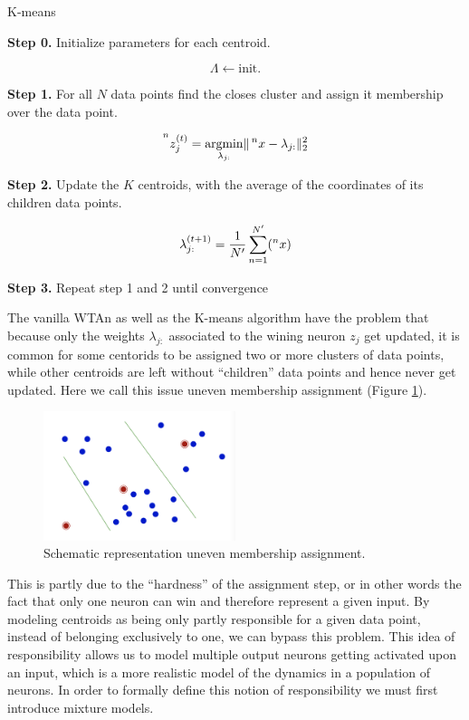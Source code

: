 \documentclass{article}
\begin{document}
\begin{algorithm}
\caption{K-means} \label{kmeans}
\begin{algorithmic}
\State \textbf{Step 0.} Initialize parameters for each centroid.

$$
\Lambda \leftarrow \text{init.}
$$

\State \textbf{Step 1.} For all $N$ data points find the closes cluster and assign it
membership over the data point.

$$
\prescript{n}{}{z^{(t)}_j} = \underset{\lambda_{j:}}{\operatorname{arg min}} \| \prescript{n}{}{x} - \lambda_{j:}\|_2^2
$$

\State \textbf{Step 2.} Update the $K$ centroids, with the average of the coordinates of its
children data points.

$$
\lambda_{j:}^{(t+1)} = \frac{1}{N'} \sum_{n=1}^{N'} (\prescript{n}{}{x})
$$

\State \textbf{Step 3.} Repeat step 1 and 2 until convergence

\end{algorithmic}
\end{algorithm}

The vanilla WTAn as well as the K-means algorithm have the problem
that because only the weights \(\lambda_{j:}\) associated to the wining
neuron \(z_j\) get updated, it is common for some centorids to be
assigned two or more clusters of data points, while other centroids are
left without ``children'' data points and hence never get updated. Here
we call this issue uneven membership assignment (Figure \ref{uma}). 

\begin{figure}[h]
\centering 
    \includegraphics[width=0.5\textwidth]{img/problems_kmeans.png}
    \caption{Schematic representation uneven membership assignment. \label{uma}}
\end{figure}

This is partly due to the ``hardness'' of the assignment step, or in other words the fact that
only one neuron can win and therefore represent a given input. By
modeling centroids as being only partly responsible for a given data
point, instead of belonging exclusively to one, we can bypass
this problem. This idea of responsibility allows us to model multiple output neurons getting
activated upon an input, which is a more realistic model of the dynamics in a population of neurons. In order to formally define this notion of responsibility we must first introduce mixture models. 
\end{document}
